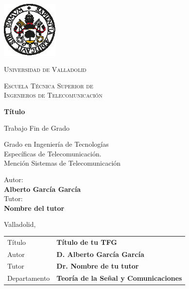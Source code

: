 \documentclass[../TFG.tex]{subfiles}
\begin{document}
\thispagestyle{empty}
\begin{center}
{\includegraphics[width=80pt]{imagenes/UVa.eps}\par}
\vspace{12pt}
{\scshape\Large Universidad de Valladolid \par}
\vspace{12pt}
{\scshape\Large Escuela Técnica Superior de\\Ingenieros de Telecomunicación \par}
\vfill
{\bfseries\LARGE Título \par}
\vfill
{\Large Trabajo Fin de Grado \par}
\vspace{12pt}
{\Large Grado en Ingeniería de Tecnologías \\ Específicas de Telecomunicación. \\
Mención Sistemas de Telecomunicación\par}
\vfill
{\Large Autor:\\} \vspace{3pt}
{\bfseries{\Large Alberto García García\\}} \vspace{6pt}
{\Large Tutor: \\} \vspace{3pt}
{\bfseries{\Large Nombre del tutor\\}}
\vspace{18pt}
{\Large Valladolid, \monthname[\the\month] \the\year \par}
\end{center}

\newpage

\large
\noindent \begin{tabularx}{\textwidth}{p{3cm} X}
\hline
Título       & \textbf{Título de tu TFG} \\
Autor        & \textbf{D. Alberto García García} \\
Tutor        & \textbf{Dr. Nombre de tu tutor}  \\
Departamento & \textbf{Teoría de la Señal y Comunicaciones}\\ 
\hline
\end{tabularx}
\end{document}
